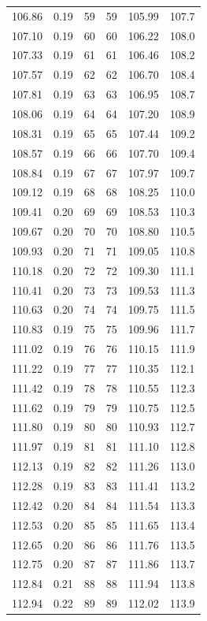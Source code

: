 \documentclass[
]{article}
\begin{document}
\begin{longtable}[]{@{}rrrrrr@{}}
106.86 & 0.19 & 59 & 59 & 105.99 & 107.7 \\
107.10 & 0.19 & 60 & 60 & 106.22 & 108.0 \\
107.33 & 0.19 & 61 & 61 & 106.46 & 108.2 \\
107.57 & 0.19 & 62 & 62 & 106.70 & 108.4 \\
107.81 & 0.19 & 63 & 63 & 106.95 & 108.7 \\
108.06 & 0.19 & 64 & 64 & 107.20 & 108.9 \\
108.31 & 0.19 & 65 & 65 & 107.44 & 109.2 \\
108.57 & 0.19 & 66 & 66 & 107.70 & 109.4 \\
108.84 & 0.19 & 67 & 67 & 107.97 & 109.7 \\
109.12 & 0.19 & 68 & 68 & 108.25 & 110.0 \\
109.41 & 0.20 & 69 & 69 & 108.53 & 110.3 \\
109.67 & 0.20 & 70 & 70 & 108.80 & 110.5 \\
109.93 & 0.20 & 71 & 71 & 109.05 & 110.8 \\
110.18 & 0.20 & 72 & 72 & 109.30 & 111.1 \\
110.41 & 0.20 & 73 & 73 & 109.53 & 111.3 \\
110.63 & 0.20 & 74 & 74 & 109.75 & 111.5 \\
110.83 & 0.19 & 75 & 75 & 109.96 & 111.7 \\
111.02 & 0.19 & 76 & 76 & 110.15 & 111.9 \\
111.22 & 0.19 & 77 & 77 & 110.35 & 112.1 \\
111.42 & 0.19 & 78 & 78 & 110.55 & 112.3 \\
111.62 & 0.19 & 79 & 79 & 110.75 & 112.5 \\
111.80 & 0.19 & 80 & 80 & 110.93 & 112.7 \\
111.97 & 0.19 & 81 & 81 & 111.10 & 112.8 \\
112.13 & 0.19 & 82 & 82 & 111.26 & 113.0 \\
112.28 & 0.19 & 83 & 83 & 111.41 & 113.2 \\
112.42 & 0.20 & 84 & 84 & 111.54 & 113.3 \\
112.53 & 0.20 & 85 & 85 & 111.65 & 113.4 \\
112.65 & 0.20 & 86 & 86 & 111.76 & 113.5 \\
112.75 & 0.20 & 87 & 87 & 111.86 & 113.7 \\
112.84 & 0.21 & 88 & 88 & 111.94 & 113.8 \\
112.94 & 0.22 & 89 & 89 & 112.02 & 113.9 \\

\end{longtable}
\end{document}
